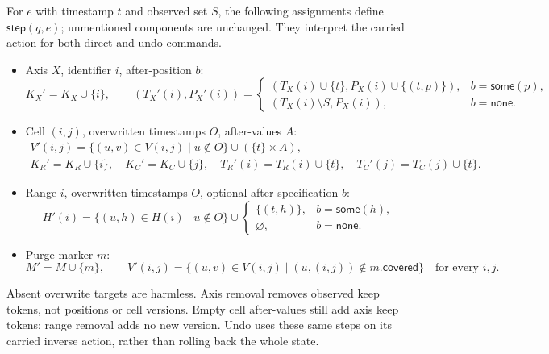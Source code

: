 \documentclass[11pt]{article}
\theoremstyle{definition}
\begin{document}
For $e$ with timestamp $t$ and observed set $S$, the following assignments
define $\mathsf{step}(q,e)$; unmentioned components are unchanged. They
interpret the carried action for both direct and undo commands.
\begin{itemize}
\item Axis $X$, identifier $i$, after-position $b$:
\[
 K_X'=K_X\cup\{i\},\qquad
 (T_X'(i),P_X'(i))=
 \begin{cases}
 (T_X(i)\cup\{t\},P_X(i)\cup\{(t,p)\}),&b=\mathsf{some}(p),\\
 (T_X(i)\setminus S,P_X(i)),&b=\mathsf{none}.
 \end{cases}
\]
\item Cell $(i,j)$, overwritten timestamps $O$, after-values $A$:
\[
\begin{gathered}
 V'(i,j)=\{(u,v)\in V(i,j)\mid u\notin O\}\cup(\{t\}\times A),\\
 K_R'=K_R\cup\{i\},\quad K_C'=K_C\cup\{j\},\quad
 T_R'(i)=T_R(i)\cup\{t\},\quad T_C'(j)=T_C(j)\cup\{t\}.
\end{gathered}
\]
\item Range $i$, overwritten timestamps $O$, optional after-specification $b$:
\[
 H'(i)=\{(u,h)\in H(i)\mid u\notin O\}\cup
 \begin{cases}\{(t,h)\},&b=\mathsf{some}(h),\\
 \varnothing,&b=\mathsf{none}.
 \end{cases}
\]
\item Purge marker $m$:
\[
 M'=M\cup\{m\},\qquad
 V'(i,j)=\{(u,v)\in V(i,j)\mid(u,(i,j))\notin m.\mathsf{covered}\}
 \quad\text{for every }i,j.
\]
\end{itemize}
Absent overwrite targets are harmless. Axis removal removes observed keep
tokens, not positions or cell versions. Empty cell after-values still add
axis keep tokens; range removal adds no new version. Undo uses these same
steps on its carried inverse action, rather than rolling back the whole state.
\end{document}
